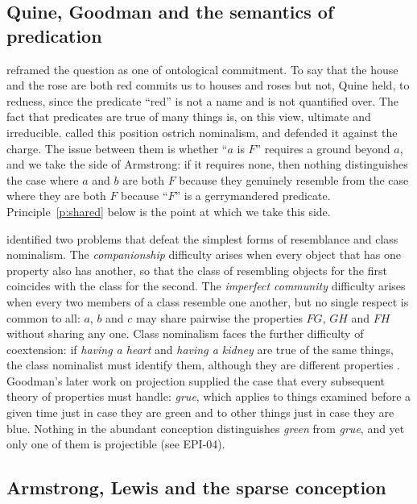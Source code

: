 \documentclass{situationist-preprint}
\begin{document}
\subsection{Quine, Goodman and the semantics of predication}

\citet{Quine1948} reframed the question as one of ontological commitment. To say that the house and the rose are both red commits us to houses and roses but not, Quine held, to redness, since the predicate \enquote{red} is not a name and is not quantified over. The fact that predicates are true of many things is, on this view, ultimate and irreducible. \citet{Armstrong1978} called this position ostrich nominalism, and \citet{Devitt1980} defended it against the charge. The issue between them is whether \enquote{$a$ is $F$} requires a ground beyond $a$, and we take the side of Armstrong: if it requires none, then nothing distinguishes the case where $a$ and $b$ are both $F$ because they genuinely resemble from the case where they are both $F$ because \enquote{$F$} is a gerrymandered predicate. Principle~\ref{p:shared} below is the point at which we take this side.

\citet{Goodman1951} identified two problems that defeat the simplest forms of resemblance and class nominalism. The \emph{companionship} difficulty arises when every object that has one property also has another, so that the class of resembling objects for the first coincides with the class for the second. The \emph{imperfect community} difficulty arises when every two members of a class resemble one another, but no single respect is common to all: $a$, $b$ and $c$ may share pairwise the properties $FG$, $GH$ and $FH$ without sharing any one. Class nominalism faces the further difficulty of coextension: if \emph{having a heart} and \emph{having a kidney} are true of the same things, the class nominalist must identify them, although they are different properties \citep{Armstrong1978}. Goodman's later work on projection \citep{Goodman1955} supplied the case that every subsequent theory of properties must handle: \emph{grue}, which applies to things examined before a given time just in case they are green and to other things just in case they are blue. Nothing in the abundant conception distinguishes \emph{green} from \emph{grue}, and yet only one of them is projectible (see EPI-04).

\subsection{Armstrong, Lewis and the sparse conception}
\end{document}
